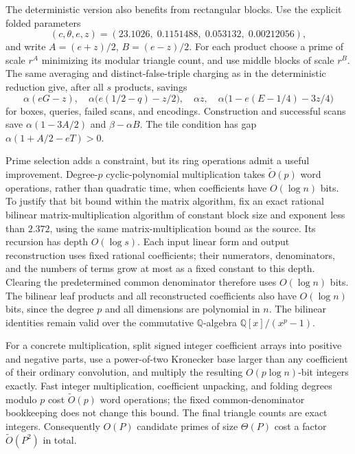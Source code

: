 \documentclass[11pt]{article}
\newcommand{\softO}{\widetilde O}
\begin{document}
The deterministic version also benefits from rectangular blocks. Use the
explicit folded parameters
\[
 (c,\theta,e,z)=(23.1026,\;0.1151488,\;0.053132,\;0.00212056),
\]
and write $A=(e+z)/2$, $B=(e-z)/2$. For each product choose a prime of
scale $r^A$ minimizing its modular triangle count, and use middle blocks
of scale $r^B$. The same averaging and distinct-false-triple charging as
in the deterministic reduction give, after all $s$ products, savings
\begin{equation}
 \alpha(eG-z),\quad
 \alpha\bigl(e(1/2-q)-z/2\bigr),\quad
 \alpha z,\quad
 \alpha\bigl(1-e(E-1/4)-3z/4\bigr)
\label{eq:rectangular-det-savings}
\end{equation}
for boxes, queries, failed scans, and encodings. Construction and successful
scans save $\alpha(1-3A/2)$ and $\beta-\alpha B$. The tile condition
has gap $\alpha(1+A/2-eT)>0$.

Prime selection adds a constraint, but its ring operations admit a useful
improvement. Degree-$p$ cyclic-polynomial multiplication takes
$\softO(p)$ word operations, rather than quadratic time, when coefficients
have $O(\log n)$ bits. To justify that bit bound within the matrix
algorithm, fix an exact rational bilinear matrix-multiplication algorithm
of constant block size and exponent less than $2.372$, using the same
matrix-multiplication bound as the source. Its recursion has depth
$O(\log s)$. Each input linear form and output reconstruction uses fixed
rational coefficients; their numerators, denominators, and the numbers of
terms grow at most as a fixed constant to this depth. Clearing the
predetermined common denominator therefore uses $O(\log n)$ bits.
The bilinear leaf products and all reconstructed coefficients also have
$O(\log n)$ bits, since the degree $p$ and all dimensions are polynomial
in $n$. The bilinear identities remain valid over the commutative
$\mathbb Q$-algebra $\mathbb Q[x]/(x^p-1)$.

For a concrete multiplication, split signed integer coefficient arrays
into positive and negative parts, use a power-of-two Kronecker base larger
than any coefficient of their ordinary convolution, and multiply the
resulting $O(p\log n)$-bit integers exactly. Fast integer multiplication,
coefficient unpacking, and folding degrees modulo $p$ cost
$\softO(p)$ word operations; the fixed common-denominator bookkeeping
does not change this bound. The final triangle counts are exact integers.
Consequently $O(P)$ candidate primes of size $\Theta(P)$ cost a factor
$\softO(P^2)$ in total.
\end{document}
